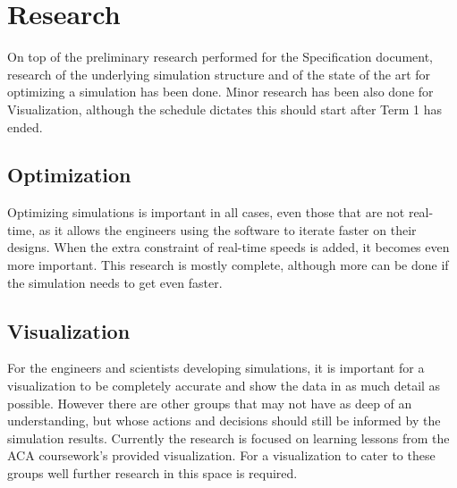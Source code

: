 
\chapter{Research}
\label{sec:Research} 
On top of the preliminary research performed for the Specification document, research of the underlying simulation structure and of the state of the art for optimizing a simulation has been done.
Minor research has been also done for Visualization, although the schedule dictates this should start after Term 1 has ended.



\section{Optimization}
\label{sec:Research:Optimization}
Optimizing simulations is important in all cases, even those that are not real-time, as it allows the engineers using the software to iterate faster on their designs.
When the extra constraint of real-time speeds is added, it becomes even more important.
This research is mostly complete, although more can be done if the simulation needs to get even faster.





\section{Visualization}
For the engineers and scientists developing simulations, it is important for a visualization to be completely accurate and show the data in as much detail as possible.
However there are other groups that may not have as deep of an understanding, but whose actions and decisions should still be informed by the simulation results.
Currently the research is focused on learning lessons from the ACA coursework's provided visualization.
For a visualization to cater to these groups well further research in this space is required.




